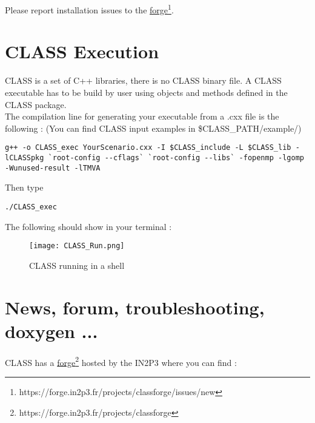 Please report installation issues to the \href{https://forge.in2p3.fr/projects/classforge/issues/new}{forge}\footnote{https://forge.in2p3.fr/projects/classforge/issues/new}.

\chapter{CLASS Execution}
CLASS is a set of C++ libraries, there is no CLASS binary file. A CLASS executable has to be build by user using objects and methods defined in the CLASS package. \\
The compilation line for generating your executable from a .cxx file is the following :
(You can find CLASS input examples in \$CLASS\_PATH/example/)

\begin{center}
\begin{minipage}{\textwidth}
\begin{lstlisting}[style=terminal]
g++ -o CLASS_exec YourScenario.cxx -I $CLASS_include -L $CLASS_lib -lCLASSpkg `root-config --cflags` `root-config --libs` -fopenmp -lgomp -Wunused-result -lTMVA
\end{lstlisting}
\end{minipage}
\end{center}
Then type 
\begin{center}
\begin{minipage}{\textwidth}
\begin{lstlisting}[style=terminal]
./CLASS_exec
\end{lstlisting}
\end{minipage}
\end{center}

The following should show in your terminal :

    \begin{figure}[H]
    \centering
    \centerline{\texttt{[image: CLASS\_Run.png]}}
    \caption{CLASS running in a shell}
    \label{fig:CLASSRUN}
    \end{figure}




\chapter{News, forum, troubleshooting, doxygen ...}
CLASS has a \href{https://forge.in2p3.fr/projects/classforge}{forge}\footnote{https://forge.in2p3.fr/projects/classforge} hosted by the IN2P3  where you can find :

